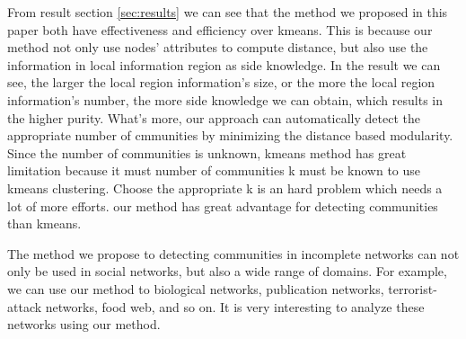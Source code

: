 From result section \ref{sec:results} we can see that the method we proposed in this paper
both have effectiveness and efficiency over kmeans.
This is because our method not only use nodes' attributes
to compute distance, but also use 
the information in local information region as side knowledge.
In the result we can see, 
the larger the local region information's size,
or the more the local region information's number,
the more side knowledge we can obtain,
which results in the higher purity.
What's more, 
our approach can automatically detect the appropriate number of cmmunities by minimizing the 
distance based modularity. Since the number of communities is unknown, 
kmeans method has great limitation because it must number of communities k must be known to
use kmeans clustering. Choose the appropriate k is an hard problem which needs a lot of more 
efforts. our method has great advantage for detecting communities than kmeans.

The method we propose to detecting communities in incomplete networks 
can not only be used in social networks, but also a wide range of domains.
For example, we can use our method to biological networks, publication networks,
terrorist-attack networks, food web, and so on. 
It is very interesting to analyze these networks using our method. 
